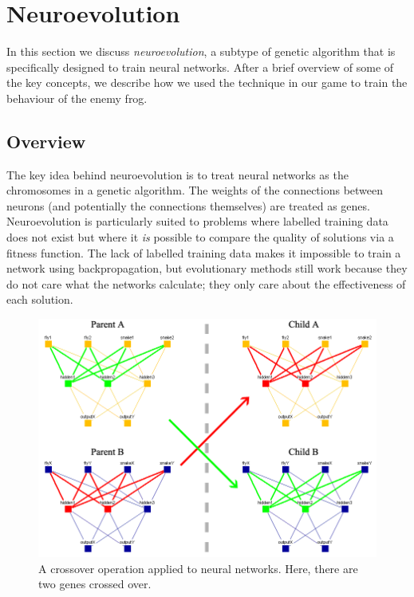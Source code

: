\clearpage
\section{Neuroevolution}

In this section we discuss \textit{neuroevolution}, a subtype of genetic algorithm that is specifically designed to train neural networks. After a brief overview of some of the key concepts, we describe how we used the technique in our game to train the behaviour of the enemy frog.

\subsection{Overview}

The key idea behind neuroevolution is to treat neural networks as the chromosomes in a genetic algorithm. The weights of the connections between neurons (and potentially the connections themselves) are treated as genes. Neuroevolution is particularly suited to problems where labelled training data does not exist but where it \textit{is} possible to compare the quality of solutions via a fitness function. The lack of labelled training data makes it impossible to train a network using backpropagation, but evolutionary methods still work because they do not care what the networks calculate; they only care about the effectiveness of each solution.

\begin{figure}[!htbp]
    \centering
    \includegraphics[scale=0.6]{Figs/Crossover.png}
    \caption{A crossover operation applied to neural networks. Here, there are two genes crossed over.}
    \label{fig:netCrossover}
\end{figure}

